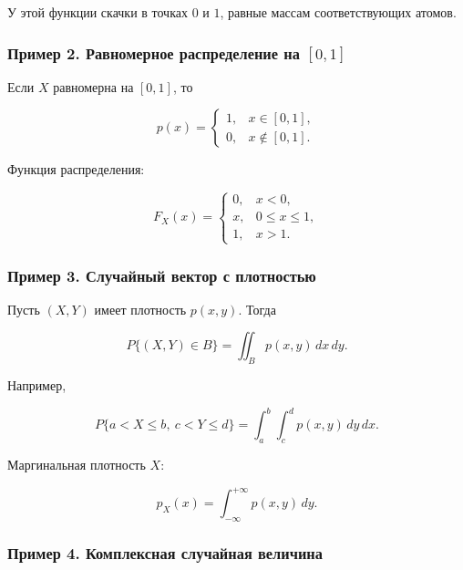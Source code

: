 \documentclass[
  11pt,
  a4paper,
]{article}
\begin{document}
У этой функции скачки в точках \(0\) и \(1\), равные массам
соответствующих атомов.

\subsubsection{\texorpdfstring{Пример 2. Равномерное распределение на
\([0,1]\)}{Пример 2. Равномерное распределение на {[}0,1{]}}}\label{ux43fux440ux438ux43cux435ux440-2.-ux440ux430ux432ux43dux43eux43cux435ux440ux43dux43eux435-ux440ux430ux441ux43fux440ux435ux434ux435ux43bux435ux43dux438ux435-ux43dux430-01}

Если \(X\) равномерна на \([0,1]\), то

\[
p(x)=
\begin{cases}
1, & x\in[0,1],\\
0, & x\notin[0,1].
\end{cases}
\]

Функция распределения:

\[
F_X(x)=
\begin{cases}
0, & x<0,\\
x, & 0\le x\le1,\\
1, & x>1.
\end{cases}
\]

\subsubsection{Пример 3. Случайный вектор с
плотностью}\label{ux43fux440ux438ux43cux435ux440-3.-ux441ux43bux443ux447ux430ux439ux43dux44bux439-ux432ux435ux43aux442ux43eux440-ux441-ux43fux43bux43eux442ux43dux43eux441ux442ux44cux44e}

Пусть \((X,Y)\) имеет плотность \(p(x,y)\). Тогда

\[
P\{(X,Y)\in B\}=\iint_B p(x,y)\,dx\,dy.
\]

Например,

\[
P\{a<X\le b,\ c<Y\le d\}
=
\int_a^b\int_c^d p(x,y)\,dy\,dx.
\]

Маргинальная плотность \(X\):

\[
p_X(x)=\int_{-\infty}^{+\infty}p(x,y)\,dy.
\]

\subsubsection{Пример 4. Комплексная случайная
величина}\label{ux43fux440ux438ux43cux435ux440-4.-ux43aux43eux43cux43fux43bux435ux43aux441ux43dux430ux44f-ux441ux43bux443ux447ux430ux439ux43dux430ux44f-ux432ux435ux43bux438ux447ux438ux43dux430}
\end{document}
